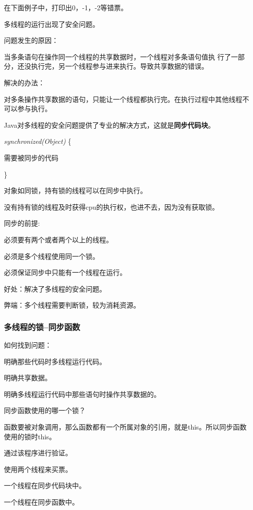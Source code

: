 \documentclass[UTF8]{ctexart}
\begin{document}
在下面例子中，打印出0，-1，-2等错票。

多线程的运行出现了安全问题。

问题发生的原因：

当多条语句在操作同一个线程的共享数据时，一个线程对多条语句值执
行了一部分，还没执行完，另一个线程参与进来执行。导致共享数据的错误。

解决的办法：

对多条操作共享数据的语句，只能让一个线程都执行完。在执行过程中其他线程不可以参与执行。

Java对多线程的安全问题提供了专业的解决方式，这就是\textbf{同步代码块}。

\textit{synchronized(Object)} \{

\qquad 需要被同步的代码

\}

对象如同锁，持有锁的线程可以在同步中执行。

没有持有锁的线程及时获得cpu的执行权，也进不去，因为没有获取锁。

同步的前提:

\textbullet 必须要有两个或者两个以上的线程。

\textbullet 必须是多个线程使用同一个锁。

必须保证同步中只能有一个线程在运行。

好处：解决了多线程的安全问题。

弊端：多个线程需要判断锁，较为消耗资源。


\subsubsection{多线程的锁--同步函数}

如何找到问题：

\textbullet 明确那些代码时多线程运行代码。

\textbullet 明确共享数据。

\textbullet 明确多线程运行代码中那些语句时操作共享数据的。



同步函数使用的哪一个锁？

函数要被对象调用，那么函数都有一个所属对象的引用，就是this。所以同步函数使用的锁时this。

通过该程序进行验证。

使用两个线程来买票。

一个线程在同步代码块中。

一个线程在同步函数中。
\end{document}
